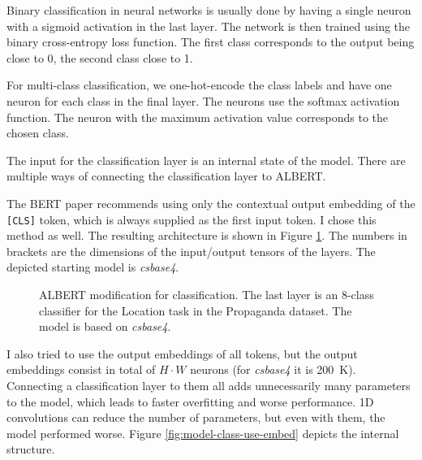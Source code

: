 \documentclass[
  printed, %
  color,   %
  table,   %
  oneside, %
  lof,     %
  lot,     %
]{fithesis3}
\begin{document}
Binary classification in neural networks is usually done by having a single neuron with a sigmoid activation in the last layer. The network is then trained using the binary cross-entropy loss function. The first class corresponds to the output being close to 0, the second class close to 1.

For multi-class classification, we one-hot-encode the class labels and have one neuron for each class in the final layer. The neurons use the softmax activation function. The neuron with the maximum activation value corresponds to the chosen class.

The input for the classification layer is an internal state of the model. There are multiple ways of connecting the classification layer to ALBERT.

\clearpage
{\parindent=0pt
    The BERT paper \parencite{bert} recommends using only the contextual output embedding of the \texttt{[CLS]} token, which is always supplied as the first input token. I chose this method as well. The resulting architecture is shown in Figure \ref{fig:class-basic}. The numbers in brackets are the dimensions of the input/output tensors of the layers. The depicted starting model is \textit{csbase4}.
}

\begin{figure}[h]
    \caption[ALBERT classification model -- basic]{
        ALBERT modification for classification. The last layer is an 8-class classifier for the Location task in the Propaganda dataset. The model is based on \textit{csbase4}.
    }
    \label{fig:class-basic}
    \centering
\end{figure}

I also tried to use the output embeddings of all tokens, but the output embeddings consist in total of $H \cdot W$ neurons (for \textit{csbase4} it is 200~K). Connecting a classification layer to them all adds unnecessarily many parameters to the model, which leads to faster overfitting and worse performance. 1D convolutions can reduce the number of parameters, but even with them, the model performed worse. Figure \ref{fig:model-class-use-embed} depicts the internal structure.
\end{document}
